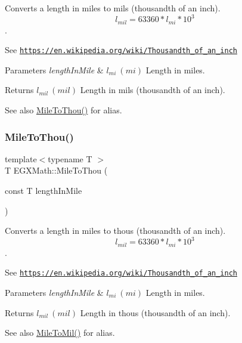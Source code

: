 Converts a length in miles to mils (thousandth of an inch). \[ l_{mil}=63360 * l_{mi} * 10^{3} \]. 

See \href{https://en.wikipedia.org/wiki/Thousandth_of_an_inch}{\tt https\+://en.\+wikipedia.\+org/wiki/\+Thousandth\+\_\+of\+\_\+an\+\_\+inch} 
\begin{DoxyParams}{Parameters}
{\em length\+In\+Mile} & $ l_{mi}\ (mi)$ Length in miles. \\
\hline
\end{DoxyParams}
\begin{DoxyReturn}{Returns}
$ l_{mil}\ (mil)$ Length in mils (thousandth of an inch). 
\end{DoxyReturn}
\begin{DoxySeeAlso}{See also}
\mbox{\hyperlink{group___e_g_x_math-_conversions-_length_conversions-_imperial-_mile-_imperial_gac5c37e3054c9b7817c9df5a348f8faf7}{Mile\+To\+Thou()}} for alias. 
\end{DoxySeeAlso}
\mbox{\label{group___e_g_x_math-_conversions-_length_conversions-_imperial-_mile-_imperial_gac5c37e3054c9b7817c9df5a348f8faf7}} 
\subsubsection{\texorpdfstring{Mile\+To\+Thou()}{MileToThou()}}
{\footnotesize\ttfamily template$<$typename T $>$ \\
T E\+G\+X\+Math\+::\+Mile\+To\+Thou (\begin{DoxyParamCaption}\item[{const T}]{length\+In\+Mile }\end{DoxyParamCaption})}



Converts a length in miles to thous (thousandth of an inch). \[ l_{mil}=63360 * l_{mi} * 10^{3} \]. 

See \href{https://en.wikipedia.org/wiki/Thousandth_of_an_inch}{\tt https\+://en.\+wikipedia.\+org/wiki/\+Thousandth\+\_\+of\+\_\+an\+\_\+inch} 
\begin{DoxyParams}{Parameters}
{\em length\+In\+Mile} & $ l_{mi}\ (mi)$ Length in miles. \\
\hline
\end{DoxyParams}
\begin{DoxyReturn}{Returns}
$ l_{mil}\ (mil)$ Length in thous (thousandth of an inch). 
\end{DoxyReturn}
\begin{DoxySeeAlso}{See also}
\mbox{\hyperlink{group___e_g_x_math-_conversions-_length_conversions-_imperial-_mile-_imperial_ga8f210f6be39b6ebd203e309b53556d22}{Mile\+To\+Mil()}} for alias. 
\end{DoxySeeAlso}
\mbox{\label{group___e_g_x_math-_conversions-_length_conversions-_imperial-_mile-_imperial_ga21dab1c2a6d7ef3bbf0d611ce5665018}} 
